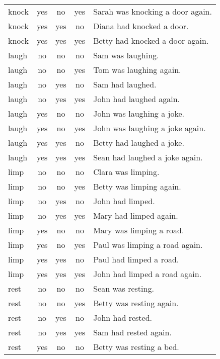 \begin{longtable}{l|ccc|p{5cm}}
knock   & yes  & no   & yes  & Sarah was knocking a door again.       \\
knock   & yes  & yes  & no   & Diana had knocked a door.              \\
knock   & yes  & yes  & yes  & Betty had knocked a door again.        \\
laugh   & no   & no   & no   & Sam was laughing.                      \\
laugh   & no   & no   & yes  & Tom was laughing again.                \\
laugh   & no   & yes  & no   & Sam had laughed.                       \\
laugh   & no   & yes  & yes  & John had laughed again.                \\
laugh   & yes  & no   & no   & John was laughing a joke.              \\
laugh   & yes  & no   & yes  & John was laughing a joke again.        \\
laugh   & yes  & yes  & no   & Betty had laughed a joke.              \\
laugh   & yes  & yes  & yes  & Sean had laughed a joke again.         \\
limp    & no   & no   & no   & Clara was limping.                     \\
limp    & no   & no   & yes  & Betty was limping again.               \\
limp    & no   & yes  & no   & John had limped.                       \\
limp    & no   & yes  & yes  & Mary had limped again.                 \\
limp    & yes  & no   & no   & Mary was limping a road.               \\
limp    & yes  & no   & yes  & Paul was limping a road again.         \\
limp    & yes  & yes  & no   & Paul had limped a road.                \\
limp    & yes  & yes  & yes  & John had limped a road again.          \\
rest    & no   & no   & no   & Sean was resting.                      \\
rest    & no   & no   & yes  & Betty was resting again.               \\
rest    & no   & yes  & no   & John had rested.                       \\
rest    & no   & yes  & yes  & Sam had rested again.                  \\
rest    & yes  & no   & no   & Betty was resting a bed.               \\

\end{longtable}
